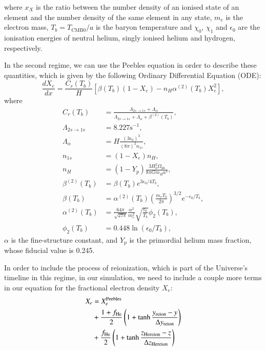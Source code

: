 \documentclass{aa}
\begin{document}
where $x_X$ is the ratio between the number density of an ionised state of an element and the number density of the same element in any state, $m_e$ is the electron mass, $T_b = T_\text{CMB0}/a$ is the baryon temperature and $\chi_0$, $\chi_1$ and $\epsilon_0$ are the ionisation energies of neutral helium, singly ionised helium and hydrogen, respectively.

In the second regime, we can use the Peebles equation in order to describe these quantities, which is given by the following Ordinary Differential Equation (ODE):
\begin{equation}
\frac{dX_e}{dx} = \frac{C_r(T_b)}{H} \left[\beta(T_b)(1-X_e) - n_H
\alpha^{(2)}(T_b)X_e^2\right],
\end{equation}
where
\begin{align}
C_r(T_b) &= \frac{\Lambda_{2s\rightarrow1s} + \Lambda_{\alpha}}{\Lambda_{2s\rightarrow1s} + \Lambda_{\alpha} + \beta^{(2)}(T_b)},\\
\Lambda_{2s\rightarrow1s} &= 8.227 \textrm{s}^{-1},\\
\Lambda_{\alpha} &= H\frac{(3\epsilon_0)^3}{(8\pi)^2 n_{1s}},\\
n_{1s} &= (1-X_e)n_H,\\
n_H &= (1-Y_p)\frac{3H_0^2\Omega_{b0}}{8\pi G m_H a^3},\\
\beta^{(2)}(T_b) &= \beta(T_b) e^{3\epsilon_0/4T_b},\\
\beta(T_b) &= \alpha^{(2)}(T_b) \left(\frac{m_eT_b}{2\pi}\right)^{3/2} e^{-\epsilon_0/T_b},\\
\alpha^{(2)}(T_b) &= \frac{64\pi}{\sqrt{27\pi}}\frac{\alpha^2}{m_e^2}\sqrt{\frac{\epsilon_0}{T_b}}\phi_2(T_b),\\
\phi_2(T_b) &= 0.448\ln(\epsilon_0/T_b),
\end{align}
$\alpha$ is the fine-structure constant, and $Y_p$ is the primordial helium mass fraction, whose fiducial value is 0.245.

In order to include the process of reionization, which is part of the Universe's timeline in this regime, in our simulation, we need to include a couple more terms in our equation for the fractional electron density $X_e$:
\begin{align}
X_e &= X_e^{\rm Peebles}\nonumber\\ &+ \frac{1+f_{\rm He}}{2}\left(1+\tanh\frac{y_{\rm reion}-y}{\Delta y_{\rm reion}}\right)\\ &+ \frac{f_{\rm He}}{2}\left(1 + \tanh \frac{z_{\rm He reion}-z}{\Delta z_{\rm He reion}}\right)\nonumber
\end{align}
\end{document}
